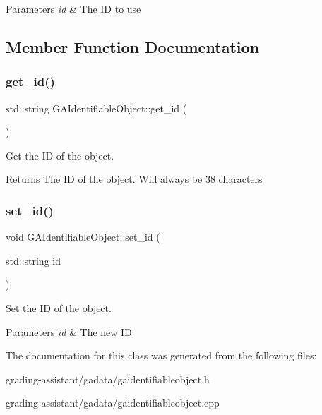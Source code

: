 \begin{DoxyParams}{Parameters}
{\em id} & The ID to use \\
\hline
\end{DoxyParams}


\subsection{Member Function Documentation}
\mbox{\label{class_g_a_identifiable_object_afdd3c5022366b4e963c2b194f55c9400}} 
\subsubsection{\texorpdfstring{get\+\_\+id()}{get\_id()}}
{\footnotesize\ttfamily std\+::string G\+A\+Identifiable\+Object\+::get\+\_\+id (\begin{DoxyParamCaption}{ }\end{DoxyParamCaption})}



Get the ID of the object. 

\begin{DoxyReturn}{Returns}
The ID of the object. Will always be 38 characters 
\end{DoxyReturn}
\mbox{\label{class_g_a_identifiable_object_a6b0a4580ef8e6e3f9b0a39fbc9d424e0}} 
\subsubsection{\texorpdfstring{set\+\_\+id()}{set\_id()}}
{\footnotesize\ttfamily void G\+A\+Identifiable\+Object\+::set\+\_\+id (\begin{DoxyParamCaption}\item[{std\+::string}]{id }\end{DoxyParamCaption})}



Set the ID of the object. 


\begin{DoxyParams}{Parameters}
{\em id} & The new ID \\
\hline
\end{DoxyParams}


The documentation for this class was generated from the following files\+:\begin{DoxyCompactItemize}
\item 
grading-\/assistant/gadata/gaidentifiableobject.\+h\item 
grading-\/assistant/gadata/gaidentifiableobject.\+cpp\end{DoxyCompactItemize}
